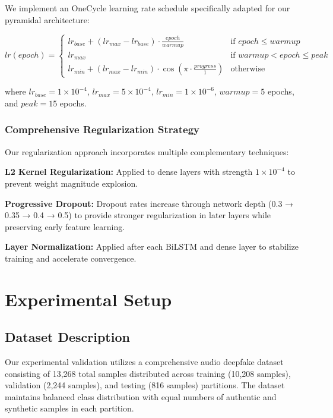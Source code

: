 \documentclass[conference]{IEEEtran}
\begin{document}
We implement an OneCycle learning rate schedule \cite{smith2019super} specifically adapted for our pyramidal architecture:

\begin{equation}
lr(epoch) = \begin{cases}
lr_{base} + (lr_{max} - lr_{base}) \cdot \frac{epoch}{warmup} & \text{if } epoch \leq warmup \\
lr_{max} & \text{if } warmup < epoch \leq peak \\
lr_{min} + (lr_{max} - lr_{min}) \cdot \cos(\pi \cdot \frac{progress}{1}) & \text{otherwise}
\end{cases}
\end{equation}

where $lr_{base} = 1 \times 10^{-4}$, $lr_{max} = 5 \times 10^{-4}$, $lr_{min} = 1 \times 10^{-6}$, $warmup = 5$ epochs, and $peak = 15$ epochs.

\subsubsection{Comprehensive Regularization Strategy}

Our regularization approach incorporates multiple complementary techniques:

\textbf{L2 Kernel Regularization:} Applied to dense layers with strength $1 \times 10^{-4}$ to prevent weight magnitude explosion.

\textbf{Progressive Dropout:} Dropout rates increase through network depth (0.3 → 0.35 → 0.4 → 0.5) to provide stronger regularization in later layers while preserving early feature learning.

\textbf{Layer Normalization:} Applied after each BiLSTM and dense layer to stabilize training and accelerate convergence.

\section{Experimental Setup}

\subsection{Dataset Description}

Our experimental validation utilizes a comprehensive audio deepfake dataset consisting of 13,268 total samples distributed across training (10,208 samples), validation (2,244 samples), and testing (816 samples) partitions. The dataset maintains balanced class distribution with equal numbers of authentic and synthetic samples in each partition.
\end{document}
